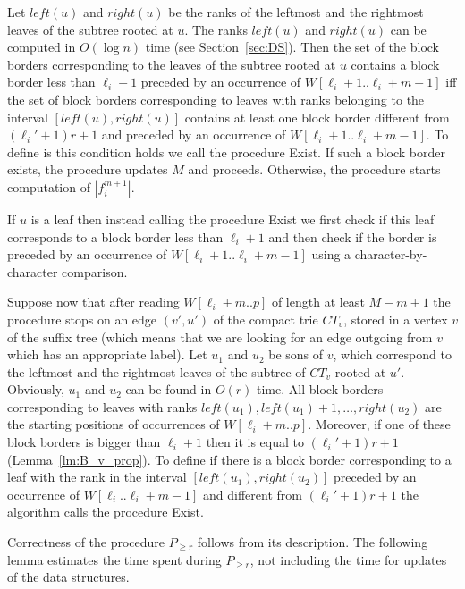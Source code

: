 \documentclass[10pt]{llncs}
\newcommand{\exist}{{\sc Exist}}
\begin{document}
Let $left(u)$ and $right(u)$ be the ranks of the leftmost and the rightmost leaves of the subtree rooted at $u$. The ranks $left(u)$ and $right(u)$ can be computed in $O(\log n)$ time (see Section~\ref{sec:DS}). Then the set of the block borders corresponding to the leaves of the subtree rooted at $u$ contains a block border less than $\ell_i+1$ preceded by an occurrence of $W[\ell_i+1..\ell_i+m-1]$ iff the set of block borders corresponding to leaves with ranks belonging to the interval $[left(u), right(u)]$ contains at least one block border different from $(\ell_i'+1)r + 1$ and preceded by an occurrence of $W[\ell_i+1..\ell_i+m-1]$. To define is this condition holds we call the procedure \exist{}. If such a block border exists, the procedure updates $M$ and proceeds. Otherwise, the procedure starts computation of $|f_i^{m+1}|$.

If $u$ is a leaf then instead calling the procedure \exist{} we first check if this leaf corresponds to a block border less than $\ell_i+1$ and then check if the border is preceded by an occurrence of $W[\ell_i+1..\ell_i+m-1]$ using a character-by-character comparison. 

Suppose now that after reading $W[\ell_i+m..p]$ of length at least $M - m + 1$ the procedure stops on an edge $(v', u')$ of the compact trie $CT_v$, stored in a vertex $v$ of the suffix tree (which means that we are looking for an edge outgoing from $v$ which has an appropriate label). Let $u_1$ and $u_2$ be sons of $v$, which correspond to the leftmost and the rightmost leaves of the subtree of $CT_v$ rooted at $u'$. Obviously, $u_1$ and $u_2$ can be found in $O(r)$ time. All block borders corresponding to leaves with ranks $left(u_1), left(u_1) + 1, \ldots, right(u_2)$ are the starting positions of occurrences of $W[\ell_i+m..p]$. Moreover, if one of these block borders is bigger than $\ell_i+1$ then it is equal to $(\ell_i'+1)r + 1$ (Lemma~\ref{lm:B_v_prop}). To define if there is a block border corresponding to a leaf with the rank in the interval $[left(u_1), right(u_2)]$ preceded by an occurrence of $W[\ell_i..\ell_i+m-1]$ and different from $(\ell_i'+1)r + 1$ the algorithm calls the procedure \exist{}.

Correctness of the procedure $P_{\geq r}$ follows from its description. The following lemma estimates the time spent during $P_{\geq r}$, not including the time for updates of the data structures.
\end{document}
